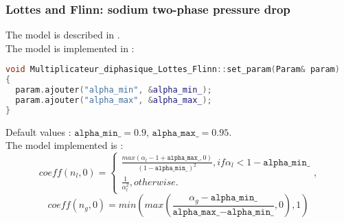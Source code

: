 \subsubsection{Lottes and Flinn: sodium two-phase pressure drop}
The model is described in \cite{lottes1956method}.\\
The model is implemented in :
\begin{lstlisting}[language=c++]
void Multiplicateur_diphasique_Lottes_Flinn::set_param(Param& param)
{
  param.ajouter("alpha_min", &alpha_min_);
  param.ajouter("alpha_max", &alpha_max_);
}
\end{lstlisting}
Default values : $\texttt{alpha\_min\_} = 0.9$, $\texttt{alpha\_max\_} = 0.95$. \\
The model implemented is :
\begin{equation}
    coeff(n_l, 0) = \begin{cases}\frac{max(\alpha_l-1+\texttt{alpha\_max\_},0)}{(1-\texttt{alpha\_min\_})^2} , if \alpha_l<1-\texttt{alpha\_min\_}\\
    \frac{1}{\alpha_l^2}, otherwise.
    \end{cases},
\end{equation}
\begin{equation}
    coeff(n_g, 0) = min(max(\frac{\alpha_g-\texttt{alpha\_min\_}}{\texttt{alpha\_max\_}-\texttt{alpha\_min\_}},0),1)
\end{equation}


